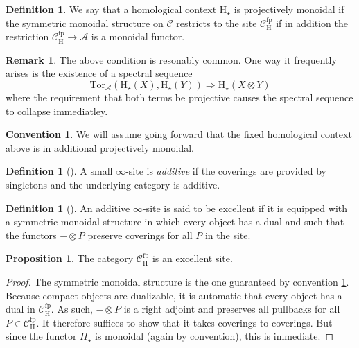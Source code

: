 \documentclass[10pt]{amsart}
\theoremstyle{definition}
\numberwithin{figure}{section}
\numberwithin{equation}{section}
\newtheorem{proposition}[figure]{Proposition}
\newtheorem{definition}[figure]{Definition}
\newtheorem{remark}[figure]{Remark}
\newtheorem{convention}[figure]{Convention}
\newcommand{\cA}{\mathcal{A}}
\newcommand{\cC}{\mathcal{C}}
\theoremstyle{cited}
\newcommand{\fp}{\mathrm{fp}}
\renewcommand{\H}{\mathrm{H}}
\newcommand{\Tor}{\mathrm{Tor}}
\begin{document}
\begin{definition}
  We say that a homological context $\H_\star$ is projectively monoidal if 
  the symmetric monoidal structure on $\cC$ restricts to the site $\cC^\fp_\H$ if in addition the restriction $\cC^\fp_\H\to \cA$ is a monoidal functor.
\end{definition}

\begin{remark}
  The above condition is resonably common. One way it frequently arises is the existence of a spectral sequence 
  \[
  \Tor_{\cA}(\H_\star(X),\H_\star(Y))\Rightarrow \H_\star(X\otimes Y)
  \]
  where the requirement that both terms be projective causes the spectral sequence to collapse immediatley.
\end{remark}

\begin{convention}\label{conv:projectivemonoidality}
  We will assume going forward that the fixed homological context above is in additional projectively monoidal.
\end{convention}

\begin{definition}[\cite{Pst22}]
  A small $\infty$-site is \textit{additive} if the coverings are provided by singletons and the underlying category is additive. 
\end{definition}

\begin{definition}[\cite{Pst22}]
  An additive $\infty$-site is said to be excellent if it is equipped with a symmetric monoidal structure in which every object has a dual and such that the functors $-\otimes P$ preserve coverings for all $P$ in the site.
\end{definition}

\begin{proposition}
  The category $\cC^\fp_\H$ is an excellent site.
\end{proposition}

\begin{proof}
  The symmetric monoidal structure is the one guaranteed by convention \ref{conv:projectivemonoidality}. Because compact objects are dualizable, it is automatic that every object has a dual in $\cC^\fp_\H$. As such, $-\otimes P$ is a right adjoint and preserves all pullbacks for all $P\in \cC^\fp_\H$. It therefore suffices to show that it takes coverings to coverings. But since the functor $H_\star$ is monoidal (again by convention), this is immediate.
\end{proof}
\end{document}
